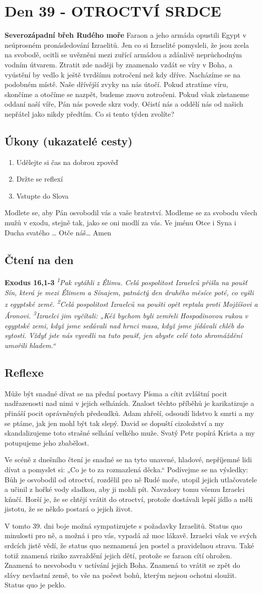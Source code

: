 \documentclass[11pt]{article}
\newcommand{\zacatekSestyTyden}{
  \textbf{Severozápadní břeh Rudého moře} \newline 
  Faraon a jeho armáda opustili Egypt v neúprosném pronásledování Izraelitů. Jen co si Izraelité pomysleli, že jsou zcela na svobodě, ocitli se uvězněni mezi zuřící armádou a zdánlivě neprůchodným vodním útvarem. Ztratit zde naději by znamenalo vzdát se víry v Boha, a vyústění by vedlo k ještě tvrdšímu zotročení než kdy dříve. Nacházíme se na podobném místě. Naše dřívější zvyky na nás útočí. Pokud ztratíme víru, skončíme a otočíme se nazpět, budeme znovu zotročeni. Pokud však zůstaneme oddaní naší víře, Pán nás povede skrz vody. Očistí nás a oddělí nás od našich nepřátel jako nikdy předtím. Co si tento týden zvolíte?

\subsection*{Úkony (ukazatelé cesty)}
\begin{enumerate}
  \item Udělejte si čas na dobrou zpověď
  \item Držte se reflexí
  \item Vstupte do Slova
\end{enumerate}
Modlete se, aby Pán osvobodil vás a vaše bratrství. \newline
Modleme se za svobodu všech mužů v exodu, stejně tak, jako se oni modlí za vás.\newline
Ve jménu Otce i Syna i Ducha svatého …  Otče náš… Amen
}
\begin{document}
\newpage
\section{Den 39 - OTROCTVÍ SRDCE}
\zacatekSestyTyden
\subsection*{Čtení na den}
\textbf{Exodus 16,1-3}
\newline
\textit{
\textsuperscript{1}Pak vytáhli z Élimu. Celá pospolitost Izraelců přišla na poušť Sín, která je mezi Élimem a Sínajem, patnáctý den druhého měsíce poté, co vyšli z egyptské země.
\textsuperscript{2}Celá pospolitost Izraelců na poušti opět reptala proti Mojžíšovi a Áronovi.
\textsuperscript{3}Izraelci jim vyčítali: „Kéž bychom byli zemřeli Hospodinovou rukou v egyptské zemi, když jsme sedávali nad hrnci masa, když jsme jídávali chléb do sytosti. Vždyť jste nás vyvedli na tuto poušť, jen abyste celé toto shromáždění umořili hladem.“
}

\subsection*{Reflexe}

Může být snadné dívat se na přední postavy Písma a cítit zvláštní pocit nadřazenosti nad nimi v jejich selháních.
Znalost těchto příběhů je karikatizuje a přináší pocit oprávněných předsudků. Adam zhřeší, odsoudí lidstvo k smrti a
my se ptáme, jak jen mohl být tak slepý. David se dopuští cizoložství a my skandalizujeme toto strašné selhání velkého
muže. Svatý Petr popírá Krista a my potupujeme jeho zbabělost.

Ve scéně z dnešního čtení je snadné se na tyto unavené, hladové, nepříjemné lidi dívat a pomyslet si: „Co je to za
rozmazlená děcka.“ Podívejme se na výsledky: Bůh je osvobodil od otroctví, rozdělil pro ně Rudé moře, utopil jejich
utlačovatele a učinil z hořké vody sladkou, aby ji mohli pít. Navzdory tomu všemu Izraelci kňučí. Horší je, že se chtějí
vrátit do otroctví, protože dostávali lepší jídlo a měli jistotu, že se někdo postará o jejich život.

V tomto 39. dni boje možná sympatizujete s požadavky Izraelitů. Status quo minulosti pro ně, a možná i pro vás,
vypadá až moc lákavě. Izraelci však ve svých srdcích jistě vědí, že status quo neznamená jen postel a pravidelnou
stravu. Také totiž znamená riziko zavraždění jejich dětí, protože se faraon cítí ohrožen. Znamená to nesvobodu
v uctívání jejich Boha. Znamená to vrátit se zpět do slávy nevlastní země, to vše na počest bohů, kterým nejsou ochotni
sloužit. Status quo je peklo.
\end{document}
